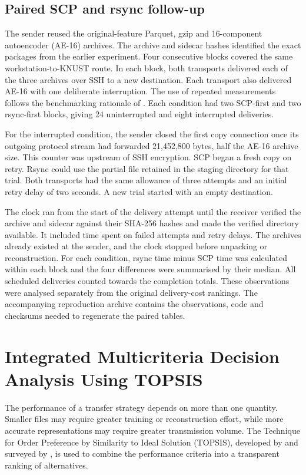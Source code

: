 \subsection{Paired SCP and rsync follow-up}\label{sec:paired-method}
The sender reused the original-feature Parquet, gzip and 16-component autoencoder (AE-16) archives. The archive and sidecar hashes identified the exact packages from the earlier experiment. Four consecutive blocks covered the same workstation-to-KNUST route. In each block, both transports delivered each of the three archives over SSH to a new destination. Each transport also delivered AE-16 with one deliberate interruption. The use of repeated measurements follows the benchmarking rationale of \citet{Kalibera2013}. Each condition had two SCP-first and two rsync-first blocks, giving 24 uninterrupted and eight interrupted deliveries.

For the interrupted condition, the sender closed the first copy connection once its outgoing protocol stream had forwarded 21,452,800 bytes, half the AE-16 archive size. This counter was upstream of SSH encryption. SCP began a fresh copy on retry. Rsync could use the partial file retained in the staging directory for that trial. Both transports had the same allowance of three attempts and an initial retry delay of two seconds. A new trial started with an empty destination.

The clock ran from the start of the delivery attempt until the receiver verified the archive and sidecar against their SHA-256 hashes and made the verified directory available. It included time spent on failed attempts and retry delays. The archives already existed at the sender, and the clock stopped before unpacking or reconstruction. For each condition, rsync time minus SCP time was calculated within each block and the four differences were summarised by their median. All scheduled deliveries counted towards the completion totals. These observations were analysed separately from the original delivery-cost rankings. The accompanying reproduction archive contains the observations, code and checksums needed to regenerate the paired tables.

\section{Integrated Multicriteria Decision Analysis Using TOPSIS}\label{integrated-multicriteria-decision-analysis-using-topsis}

The performance of a transfer strategy depends on more than one
quantity. Smaller files may require greater training or reconstruction
effort, while more accurate representations may require greater
transmission volume. The Technique for Order Preference by Similarity to
Ideal Solution (TOPSIS), developed by \cite{Hwang1981} and surveyed by \cite{Behzadian2012}, is used to
combine the performance criteria into a transparent ranking of
alternatives.

